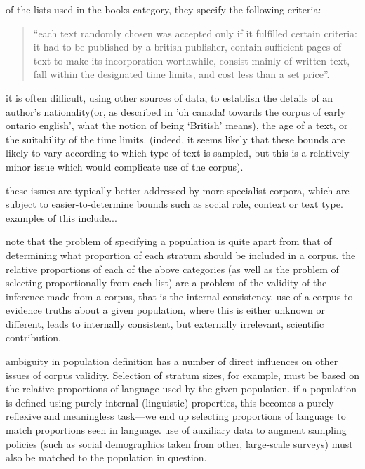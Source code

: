 of the lists used in the books category, they specify the following criteria:

\begin{quotation}
``each text randomly chosen was accepted only if it fulfilled certain criteria: it had to be published by a british publisher, contain sufficient pages of text to make its incorporation worthwhile, consist mainly of written text, fall within the designated time limits, and cost less than a set price''.
\end{quotation}

it is often difficult, using other sources of data, to establish the details of an author's nationality(or, as described in 'oh canada! towards the corpus of early ontario english', what the notion of being `British' means), the age of a text, or the suitability of the time limits.  (indeed, it seems likely that these bounds are likely to vary according to which type of text is sampled, but this is a relatively minor issue which would complicate use of the corpus).

these issues are typically better addressed by more specialist corpora, which are subject to easier-to-determine bounds such as social role, context or text type.  examples of this include...


note that the problem of specifying a population is quite apart from that of determining what proportion of each stratum should be included in a corpus.  the relative proportions of each of the above categories (as well as the problem of selecting proportionally from each list) are a problem of the validity of the inference made from a corpus, that is the internal consistency.  use of a corpus to evidence truths about a given population, where this is either unknown or different, leads to internally consistent, but externally irrelevant, scientific contribution.

ambiguity in population definition has a number of direct influences on other issues of corpus validity. Selection of stratum sizes, for example, must be based on the relative proportions of language used by the given population. if a population is defined using purely internal (linguistic) properties, this becomes a purely reflexive and meaningless task---we end up selecting proportions of language to match proportions seen in language.  use of auxiliary data to augment sampling policies (such as social demographics taken from other, large-scale surveys) must also be matched to the population in question.

